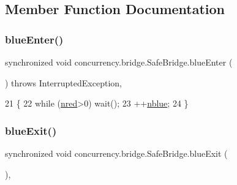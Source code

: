\subsection{Member Function Documentation}
\mbox{\label{classconcurrency_1_1bridge_1_1_safe_bridge_a28cc98eb975d533c2c51c995b7f7362a}} 
\subsubsection{\texorpdfstring{blue\+Enter()}{blueEnter()}}
{\footnotesize\ttfamily synchronized void concurrency.\+bridge.\+Safe\+Bridge.\+blue\+Enter (\begin{DoxyParamCaption}{ }\end{DoxyParamCaption}) throws Interrupted\+Exception\hspace{0.3cm}{\ttfamily [inline]}, {\ttfamily [package]}}


\begin{DoxyCode}
21                                                               \{
22         \textcolor{keywordflow}{while} (\mbox{\hyperlink{classconcurrency_1_1bridge_1_1_safe_bridge_aa2abb2203b25978e240bb355a84ae5fc}{nred}}>0) wait();
23         ++\mbox{\hyperlink{classconcurrency_1_1bridge_1_1_safe_bridge_ac3f25c616210ab4cc7af4882a0145ae6}{nblue}};
24     \}
\end{DoxyCode}
\mbox{\label{classconcurrency_1_1bridge_1_1_safe_bridge_aaabab0c6e58580d01fd01fd6ec242085}} 
\subsubsection{\texorpdfstring{blue\+Exit()}{blueExit()}}
{\footnotesize\ttfamily synchronized void concurrency.\+bridge.\+Safe\+Bridge.\+blue\+Exit (\begin{DoxyParamCaption}{ }\end{DoxyParamCaption})\hspace{0.3cm}{\ttfamily [inline]}, {\ttfamily [package]}}


